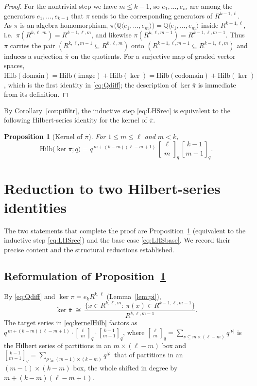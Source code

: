 \documentclass{amsart}
\newtheorem{proposition}{Proposition}
\theoremstyle{definition}
\newcommand{\Hilb}{\mathrm{Hilb}}
\newcommand{\qbin}[2]{\genfrac{[}{]}{0pt}{}{#1}{#2}_q}
\newcommand{\Q}{\mathbb{Q}}
\newcommand{\rkl}{R^{k,\ell}}
\newcommand{\Rklm}{R^{k,\ell,m}}
\begin{document}
\begin{proof}
For the nontrivial step we have $m\le k-1$, so $e_1,\dots,e_m$ are among the
generators $e_1,\dots,e_{k-1}$ that $\pi$ sends to the corresponding generators of
$R^{k-1,\ell}$. As $\pi$ is an algebra homomorphism,
$\pi\big(\Q\langle e_1,\dots,e_m\rangle\big)=\Q\langle e_1,\dots,e_m\rangle$ inside
$R^{k-1,\ell}$, i.e.\ $\pi(\Rklm)=R^{k-1,\ell,m}$, and likewise
$\pi(R^{k,\ell,m-1})=R^{k-1,\ell,m-1}$. Thus $\pi$ carries the pair
$(R^{k,\ell,m-1}\subseteq\Rklm)$ onto $(R^{k-1,\ell,m-1}\subseteq R^{k-1,\ell,m})$
and induces a surjection $\overline{\pi}$ on the quotients. For a surjective map of
graded vector spaces, $\Hilb(\text{domain})=\Hilb(\text{image})+\Hilb(\ker)
=\Hilb(\text{codomain})+\Hilb(\ker)$, which is the first identity in \eqref{eq:Qdiff};
the description of $\ker\overline\pi$ is immediate from its definition.
\end{proof}

By Corollary~\ref{cor:pifiltr}, the inductive step \eqref{eq:LHSrec} is equivalent
to the following Hilbert-series identity for the kernel of $\overline\pi$.

\begin{proposition}[Kernel of $\overline\pi$]\label{prop:kernel}
For $1\le m\le\ell$ and $m<k$,
\begin{equation}\label{eq:kernelHilb}
\Hilb\big(\ker\overline\pi;q\big)
= q^{\,m+(k-m)(\ell-m+1)}\,\qbin{\ell}{m}\,\qbin{k-1}{m-1}.
\end{equation}
\end{proposition}

\section{Reduction to two Hilbert-series identities}

The two statements that complete the proof are Proposition~\ref{prop:kernel}
(equivalent to the inductive step \eqref{eq:LHSrec}) and the base case
\eqref{eq:LHSbase}. We record their precise content and the structural reductions
established.

\subsection*{Reformulation of Proposition~\ref{prop:kernel}}
By \eqref{eq:Qdiff} and $\ker\pi=e_k\rkl$ (Lemma~\ref{lem:pi}),
\[
\ker\overline\pi\ \cong\
\frac{\{x\in\Rklm:\ \pi(x)\in R^{k-1,\ell,m-1}\}}{R^{k,\ell,m-1}} .
\]
The target series in \eqref{eq:kernelHilb} factors as
$q^{\,m+(k-m)(\ell-m+1)}\cdot\qbin{\ell}{m}\cdot\qbin{k-1}{m-1}$, where
$\qbin{\ell}{m}=\sum_{\nu\subseteq m\times(\ell-m)}q^{|\nu|}$ is the Hilbert series
of partitions in an $m\times(\ell-m)$ box and
$\qbin{k-1}{m-1}=\sum_{\rho\subseteq(m-1)\times(k-m)}q^{|\rho|}$ that of partitions
in an $(m-1)\times(k-m)$ box, the whole shifted in degree by $m+(k-m)(\ell-m+1)$.
\end{document}
